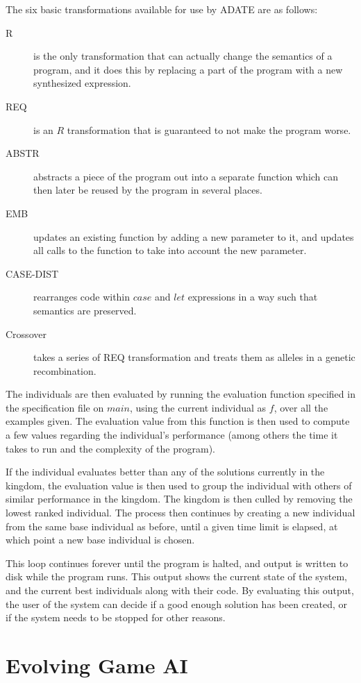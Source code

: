 \documentclass[]{report}
\begin{document}
The six basic transformations available for use by ADATE are as follows:
\begin{description}
\item[R] is the only transformation that can actually change the semantics of a
  program, and it does this by replacing a part of the program with a new
  synthesized expression.
\item[REQ] is an \(R\) transformation that is guaranteed to not make the program
  worse.
\item[ABSTR] abstracts a piece of the program out into a separate function which
  can then later be reused by the program in several places.
\item[EMB] updates an existing function by adding a new parameter to it, and
  updates all calls to the function to take into account the new parameter.
\item[CASE-DIST] rearranges code within \(case\) and \(let\) expressions in a
  way such that semantics are preserved.
\item[Crossover] takes a series of REQ transformation and treats them as alleles
  in a genetic recombination.
\end{description}

The individuals are then evaluated by running the evaluation function specified
in the specification file on \(main\), using the current individual as \(f\),
over all the examples given. The evaluation value from this function is then
used to compute a few values regarding the individual's performance (among others
the time it takes to run and the complexity of the program).

If the individual evaluates better than any of the solutions currently in the
kingdom, the evaluation value is then used to group the individual with others
of similar performance in the kingdom. The kingdom is then culled by removing
the lowest ranked individual. The process then continues by creating a new
individual from the same base individual as before, until a given time limit is
elapsed, at which point a new base individual is chosen.

This loop continues forever until the program is halted, and output is written
to disk while the program runs. This output shows the current state of the
system, and the current best individuals along with their code. By evaluating
this output, the user of the system can decide if a good enough solution has
been created, or if the system needs to be stopped for other reasons.

\chapter{Evolving Game AI}
\label{cha:game-ai-via}
\end{document}
